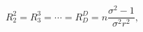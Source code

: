 \begin{equation}
R_{2}^{2}=R_{3}^{3}=\cdots =R_{D}^{D}=n\frac{\sigma ^{2}-1}{\sigma
^{2}r^{2}},  \label{mRictens}
\end{equation}

